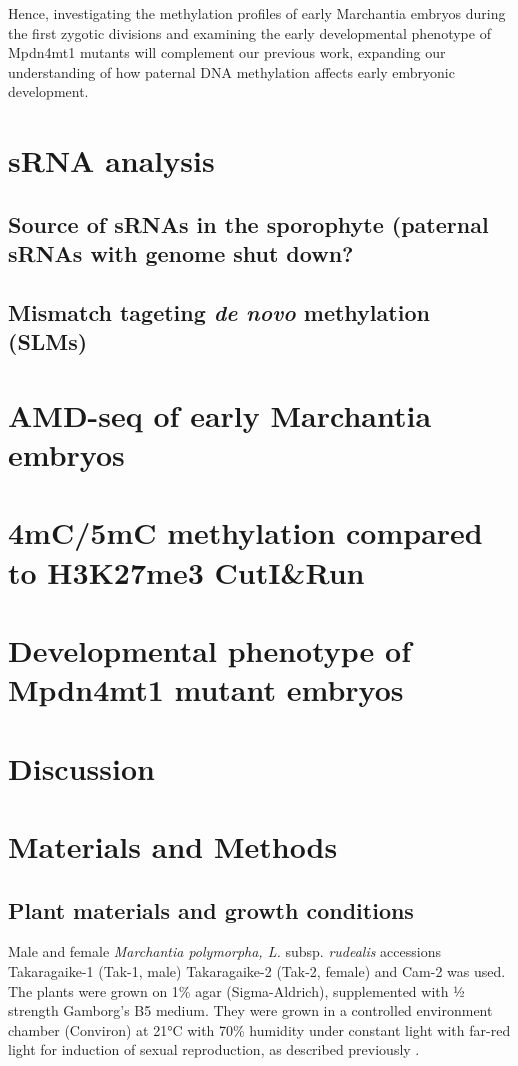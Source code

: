 Hence, investigating the methylation profiles of early Marchantia embryos during the first zygotic divisions and examining the early developmental phenotype of Mpdn4mt1 mutants will complement our previous work, expanding our understanding of how paternal DNA methylation affects early embryonic development.


\section{sRNA analysis}
\subsection{Source of sRNAs in the sporophyte (paternal sRNAs with genome shut down?}
\subsection{Mismatch tageting \textit{de novo} methylation (SLMs)}

\section{AMD-seq of early Marchantia embryos}

\section{4mC/5mC methylation compared to H3K27me3 CutI\&Run}

\section{Developmental phenotype of Mpdn4mt1 mutant embryos}

\section{Discussion}

\section{Materials and Methods}

\subsection{Plant materials and growth conditions}

Male and female \textit{Marchantia polymorpha, L.} subsp. \textit{rudealis} accessions Takaragaike-1 (Tak-1, male) Takaragaike-2 (Tak-2, female) and Cam-2 was used. The plants were grown on 1\% agar (Sigma-Aldrich), supplemented with ½ strength Gamborg's B5 medium. They were grown in a controlled environment chamber (Conviron) at 21°C with 70\% humidity under constant light with far-red light for induction of sexual reproduction, as described previously \citep{RN212,RN254}.


